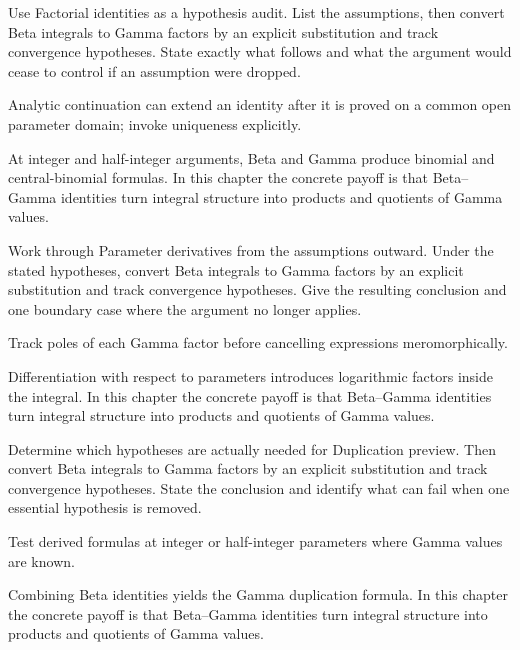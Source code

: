 \begin{exercise}\label{exr:iv20-06}
Use Factorial identities as a hypothesis audit. List the assumptions, then convert Beta integrals to Gamma factors by an explicit substitution and track convergence hypotheses. State exactly what follows and what the argument would cease to control if an assumption were dropped.
\end{exercise}
\begin{hint}
Analytic continuation can extend an identity after it is proved on a common open parameter domain; invoke uniqueness explicitly.
\end{hint}
\begin{solution}
At integer and half-integer arguments, Beta and Gamma produce binomial and central-binomial formulas. In this chapter the concrete payoff is that Beta--Gamma identities turn integral structure into products and quotients of Gamma values.
\end{solution}

\begin{exercise}\label{exr:iv20-07}
Work through Parameter derivatives from the assumptions outward. Under the stated hypotheses, convert Beta integrals to Gamma factors by an explicit substitution and track convergence hypotheses. Give the resulting conclusion and one boundary case where the argument no longer applies.
\end{exercise}
\begin{hint}
Track poles of each Gamma factor before cancelling expressions meromorphically.
\end{hint}
\begin{solution}
Differentiation with respect to parameters introduces logarithmic factors inside the integral. In this chapter the concrete payoff is that Beta--Gamma identities turn integral structure into products and quotients of Gamma values.
\end{solution}

\begin{exercise}\label{exr:iv20-08}
Determine which hypotheses are actually needed for Duplication preview. Then convert Beta integrals to Gamma factors by an explicit substitution and track convergence hypotheses. State the conclusion and identify what can fail when one essential hypothesis is removed.
\end{exercise}
\begin{hint}
Test derived formulas at integer or half-integer parameters where Gamma values are known.
\end{hint}
\begin{solution}
Combining Beta identities yields the Gamma duplication formula. In this chapter the concrete payoff is that Beta--Gamma identities turn integral structure into products and quotients of Gamma values.
\end{solution}

